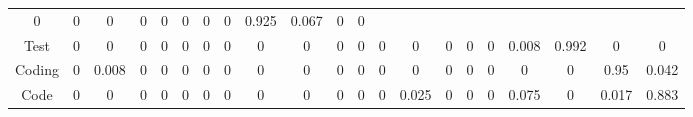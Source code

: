 \documentclass[12pt]{article} %
\begin{document}
\begin{table}[h]
{\begin{tabular}{ccccccccccccccccccccc}
0 & 0 & 0 & 0 & 0 & 0 & 0 & 0 & 0.925 & 0.067 & 0 & 0\\         Test & 0 & 0 & 0 & 0 & 0 & 0 & 0 & 0 & 0 & 0 & 0 & 0 & 0 & 0 & 0 & 0 & 0.008 & 0.992 & 0 & 0\\               Coding & 0 & 0.008 & 0 & 0 & 0 & 0 & 0 & 0 & 0 & 0 & 0 & 0 & 0 & 0 & 0 & 0 & 0 & 0 & 0.95 & 0.042\\          Code & 0 & 0 & 0 & 0 & 0 & 0 & 0 & 0 & 0 & 0 & 0 & 0 & 0.025 & 0 & 0 & 0 & 0.075 & 0 & 0.017 & 0.883\\ 

\hline
\end{tabular}}
\end{table}

\begin{table}[ht]
\caption{测试集人数为9的混淆矩阵，准确率为78.5\%}
\label{tb:conf9}
\centering
{}
\end{table}
\end{document}
